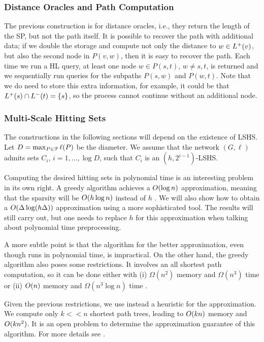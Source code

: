\subsubsection{Distance Oracles and Path Computation} \label{sec:path_oracl}
The previous construction is for distance oracles, i.e., they return the length of the SP, but not the path itself.
It is possible to recover the path with additional data; if we double the storage and compute not only the distance to $w\in L^+(v)$, but also the second node in $P(v,w)$, then it is easy to recover the path.
Each time we run a HL query, at least one node $w\in P(s,t)$, $w\neq s,t$, is returned and we sequentially run queries for the subpaths $P(s,w)$ and $P(w,t)$.
Note that we do need to store this extra information, for example, it could be that $L^+(s)\cap L^-(t)=\{s\}$, so the process cannot continue without an additional node.

\subsubsection{Multi-Scale Hitting Sets} \label{sec:multi_scale}
The constructions in the following sections will depend on the existence of LSHS.
Let $D=\max_{P\in\mathcal{P}}\ell(P)$ be the diameter.
We assume that the network $(G,\ell)$ admits sets $C_i$, $i=1,\ldots,\log D$, such that $C_i$ is an $(h,2^{i-1})$-LSHS.


Computing the desired hitting sets in polynomial time is an interesting problem in its own right.
A greedy algorithm achieves a $O(\log n)$ approximation, meaning that the sparsity will be $O(h\log n)$ instead of $h$ .
We will also show how to obtain a $O(\Delta\log(h\Delta))$ approximation using a more sophisticated tool.
The results will still carry out, but one needs to replace $h$ for this approximation when talking about polynomial time preprocessing.

A more subtle point is that the algorithm for the better approximation, even though runs in polynomial time, is impractical.
On the other hand, the greedy algorithm also poses some restrictions.
It involves an all shortest path computation, so it can be done either with (i) $\Omega(n^2)$ memory and $\Omega(n^3)$ time or (ii) $O(n)$ memory and $\Omega(n^3\log n)$ time . 

Given the previous restrictions, we use instead a heuristic for the approximation.
We compute only $k<<n$ shortest path trees, leading to $O(kn)$ memory and $O(kn^2)$.
It is an open problem to determine the approximation guarantee of this algorithm.
For more details see .
